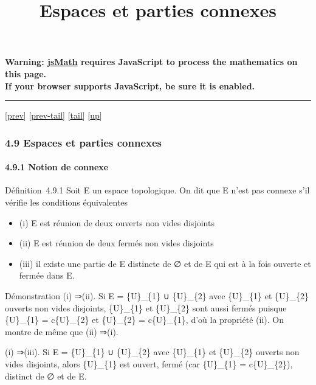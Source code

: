 \documentclass[]{article}
\title{Espaces et parties connexes}
\author{}
\date{}
\begin{document}
\maketitle

\textbf{Warning: \href{http://www.math.union.edu/locate/jsMath}{jsMath}
requires JavaScript to process the mathematics on this page.\\ If your
browser supports JavaScript, be sure it is enabled.}

\begin{center}\rule{3in}{0.4pt}\end{center}

{[}\href{coursse25.html}{prev}{]}
{[}\href{coursse25.html\#tailcoursse25.html}{prev-tail}{]}
{[}\hyperref[tailcoursse26.html]{tail}{]}
{[}\href{coursch5.html\#coursse26.html}{up}{]}

\subsubsection{4.9 Espaces et parties connexes}

\paragraph{4.9.1 Notion de connexe}

Définition~4.9.1 Soit E un espace topologique. On dit que E n'est pas
connexe s'il vérifie les conditions équivalentes

\begin{itemize}
\itemsep1pt\parskip0pt
\item
  (i) E est réunion de deux ouverts non vides disjoints
\item
  (ii) E est réunion de deux fermés non vides disjoints
\item
  (iii) il existe une partie de E distincte de ∅ et de E qui est à la
  fois ouverte et fermée dans E.
\end{itemize}

Démonstration (i) ⇒(ii). Si E = \{U\}\_\{1\} ∪ \{U\}\_\{2\} avec
\{U\}\_\{1\} et \{U\}\_\{2\} ouverts non vides disjoints, \{U\}\_\{1\}
et \{U\}\_\{2\} sont aussi fermés puisque \{U\}\_\{1\} = c\{U\}\_\{2\}
et \{U\}\_\{2\} = c\{U\}\_\{1\}, d'où la propriété (ii). On montre de
même que (ii) ⇒(i).

(i) ⇒(iii). Si E = \{U\}\_\{1\} ∪ \{U\}\_\{2\} avec \{U\}\_\{1\} et
\{U\}\_\{2\} ouverts non vides disjoints, alors \{U\}\_\{1\} est ouvert,
fermé (car \{U\}\_\{1\} = c\{U\}\_\{2\}), distinct de ∅ et de E.
\end{document}
